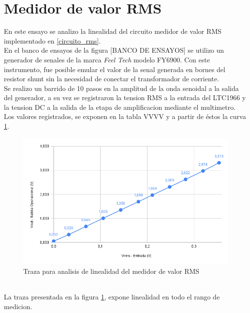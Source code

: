 \section{Medidor de valor RMS}\label{ensayo_medidor_rms}
En este ensayo se analizo la linealidad del circuito medidor de valor RMS implementado en \ref{circuito_rms}.\\
En el banco de ensayos de la figura [BANCO DE ENSAYOS] se utilizo un generador de senales de la marca \textit{Feel Tech} modelo FY6900. Con este instrumento, fue posible emular el valor de la senal generada en bornes del resistor shunt sin la necesidad de conectar el transformador de corriente.\\
Se realizo un barrido de 10 pasos en la amplitud de la onda senoidal a la salida del generador, a su vez se registraron la tension RMS a la entrada del LTC1966 y la tension DC a la salida de la etapa de amplificacion mediante el multimetro. Los valores registrados, se exponen en la tabla VVVV y a partir de \'{e}stos la curva \ref{fig:ensayoinealidadmedidorrms}.\\
\begin{figure}[h]
	\centering
	\includegraphics[width=1.0\linewidth]{Figures/ensayo_inealidad_medidor_RMS}
	\caption{Traza para analisis de linealidad del medidor de valor RMS}
	\label{fig:ensayoinealidadmedidorrms}
\end{figure}\\
La traza presentada en la figura \ref{fig:ensayoinealidadmedidorrms}, expone linealidad en todo el rango de medicion. 

